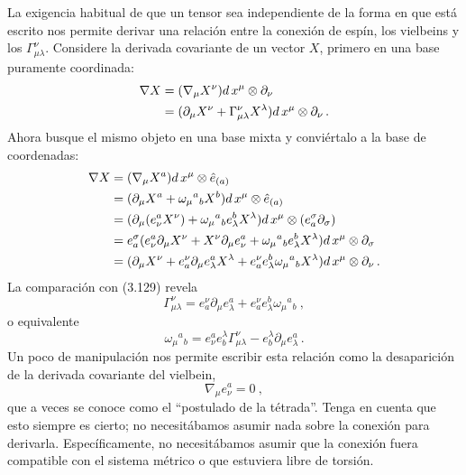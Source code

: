 \documentclass[11pt,b5paper,openany,twoside]{book}
\newcommand{\e}[1]{\hat{e}_{(#1)}}
\newcommand{\p}[1]{{\partial_{#1}}}
\begin{document}
La exigencia habitual de que un tensor sea independiente de la forma en que está escrito nos permite derivar una relación entre la conexión de espín, los vielbeins y los $\Gamma^\nu_{\mu\lambda}$.
Considere la derivada covariante de un vector $X$, primero en una base puramente coordinada:
\begin{align}
\nabla X &=  (\nabla_\mu X^\nu) d\,x^\mu\otimes
\partial_\nu \notag \\  &= (\partial_\mu X^\nu +\Gamma^\nu_{\mu\lambda}
X^\lambda) d\,x^\mu\otimes \partial_\nu\,. \label{3.129}
\end{align}
Ahora busque el mismo objeto en una base mixta y conviértalo a la base de coordenadas:
\begin{align}
\nabla X &=  (\nabla_\mu X^a) d\,x^\mu\otimes
\e{a} \notag \\   &= (\partial_\mu X^a +\omega_\mu{}^a{}_b X^b) d\,x^\mu
\otimes \e{a} \notag \\
&= (\partial_\mu(e^a_\nu X^\nu)+\omega_\mu{}^a{}_b e^b_\lambda
X^\lambda) d\,x^\mu \otimes(e^\sigma_a \partial_\sigma) \notag \\
&= e^\sigma_a(e^a_\nu \partial_\mu X^\nu +X^\nu \partial_\mu
e^a_\nu +\omega_\mu{}^a{}_b e^b_\lambda X^\lambda) d\,x^\mu \otimes
\partial_\sigma \notag \\
&= (\partial_\mu X^\nu+e^\nu_a \partial_\mu e^a_\lambda X^\lambda
+e^\nu_a e^b_\lambda \omega_\mu{}^a{}_b X^\lambda) d\,x^\mu \otimes
\partial_\nu \,. \label{3.130}
\end{align}
La comparación con (3.129) revela
\begin{equation}
\Gamma^\nu_{\mu\lambda}=e^\nu_a \partial_\mu e^a_\lambda
+e^\nu_a e^b_\lambda \omega_\mu{}^a{}_b\ ,\label{3.131}
\end{equation}
o equivalente
\begin{equation}
\omega_\mu{}^a{}_b = e^a_\nu e^\lambda_b \Gamma^\nu_{\mu\lambda}
- e^\lambda_b\p\mu e^a_\lambda\,.\label{3.132}
\end{equation}
Un poco de manipulación nos permite escribir esta relación como la desaparición de la derivada covariante del vielbein,
\begin{equation}
\nabla_\mu e_\nu^a=0\ ,\label{3.133}
\end{equation}
que a veces se conoce como el ``postulado de la tétrada''. Tenga en cuenta que esto siempre es cierto; no necesitábamos asumir nada sobre la conexión para derivarla.
Específicamente, no necesitábamos asumir que la conexión fuera compatible con el sistema métrico o que estuviera libre de torsión.
\end{document}
